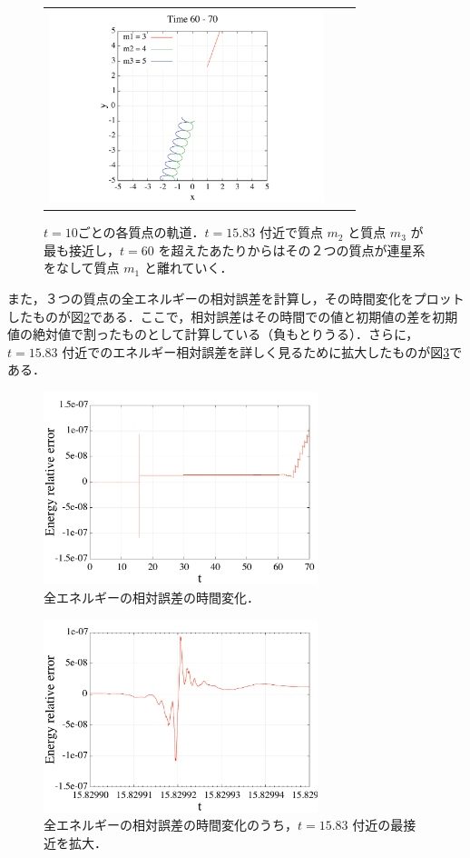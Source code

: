 \documentclass[11pt,a4paper,oneside,onecolumn]{jreport}
\begin{document}
\begin{figure}[H]
\begin{tabular}{ccc}
%
\begin{minipage}[t]{0.45\hsize}
\centering
\includegraphics[width=8cm]{./image/pythagoras_orbit_60to70.pdf}
\end{minipage}
\end{tabular}
\caption{$t = 10$ごとの各質点の軌道．$t = 15.83$ 付近で質点 $m_2$ と質点 $m_3$ が最も接近し，$t = 60$ を超えたあたりからはその２つの質点が連星系をなして質点 $m_1$ と離れていく．\label{fig:pythagoras_orbit}}
\end{figure}

また，３つの質点の全エネルギーの相対誤差を計算し，その時間変化をプロットしたものが図\ref{fig:pythagoras_E_error}である．ここで，相対誤差はその時間での値と初期値の差を初期値の絶対値で割ったものとして計算している（負もとりうる）．さらに，$t = 15.83$ 付近でのエネルギー相対誤差を詳しく見るために拡大したものが図\ref{fig:pythagoras_E_error_detail}である．
\begin{figure}[H]
\centering
\includegraphics[width=8cm]{./image/pythagoras_E_error.pdf}
\caption{全エネルギーの相対誤差の時間変化．\label{fig:pythagoras_E_error}}
\end{figure}

\begin{figure}[H]
\centering
\includegraphics[width=8cm]{./image/pythagoras_E_error_detail.pdf}
\caption{全エネルギーの相対誤差の時間変化のうち，$t = 15.83$ 付近の最接近を拡大．\label{fig:pythagoras_E_error_detail}}
\end{figure}
\end{document}
